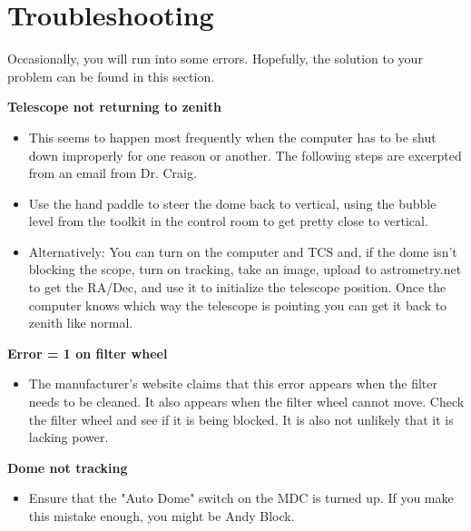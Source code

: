 \documentclass[letterpaper, 12pt]{report}
\begin{document}
\chapter{Troubleshooting}
Occasionally, you will run into some errors. Hopefully, the solution to your problem can be found in this section.

\textbf{Telescope not returning to zenith}
\begin{itemize}
	\item This seems to happen most frequently when the computer has to be shut down improperly for one reason or another. The following steps are excerpted from an email from Dr. Craig.
	\item Use the hand paddle to steer the dome back to vertical, using the bubble level from the toolkit in the control room to get pretty close to vertical. 
	\item Alternatively: You can turn on the computer and TCS and, if the dome isn’t blocking the scope, turn on tracking, take an image, upload to astrometry.net to get the RA/Dec, and use it to initialize the telescope position. Once the computer knows which way the telescope is pointing you can get it back to zenith like normal.
\end{itemize}
\textbf{Error = 1 on filter wheel}
\begin{itemize}
	\item The manufacturer's website claims that this error appears when the filter needs to be cleaned. It also appears when the filter wheel cannot move. Check the filter wheel and see if it is being blocked. It is also not unlikely that it is lacking power.
\end{itemize}
\textbf{Dome not tracking}
\begin{itemize}
	\item Ensure that the "Auto Dome" switch on the MDC is turned up. If you make this mistake enough, you might be Andy Block.
\end{itemize}
\end{document}
